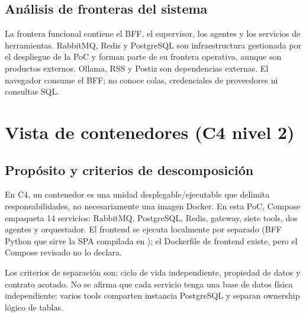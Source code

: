 \documentclass[12pt,oneside]{report}
\newcommand{\code}[1]{\texttt{\detokenize{#1}}}
\begin{document}
\subsection{Análisis de fronteras del sistema}
La frontera funcional contiene el BFF, el supervisor, los agentes y los servicios de herramientas. RabbitMQ, Redis y PostgreSQL son infraestructura gestionada por el despliegue de la PoC y forman parte de su frontera operativa, aunque son productos externos. Ollama, RSS y Postiz son dependencias externas. El navegador consume el BFF; no conoce colas, credenciales de proveedores ni consultas SQL.

\section{Vista de contenedores (C4 nivel 2)}

\subsection{Propósito y criterios de descomposición}
En C4, un contenedor es una unidad desplegable/ejecutable que delimita responsabilidades, no necesariamente una imagen Docker. En esta PoC, Compose empaqueta 14 servicios: RabbitMQ, PostgreSQL, Redis, gateway, siete tools, dos agentes y orquestador. El frontend se ejecuta localmente por separado (BFF Python que sirve la SPA compilada en \code{frontend/static}); el Dockerfile de frontend existe, pero el Compose revisado no lo declara.

Los criterios de separación son: ciclo de vida independiente, propiedad de datos y contrato acotado. No se afirma que cada servicio tenga una base de datos física independiente: varios tools comparten instancia PostgreSQL y separan ownership lógico de tablas.
\end{document}

